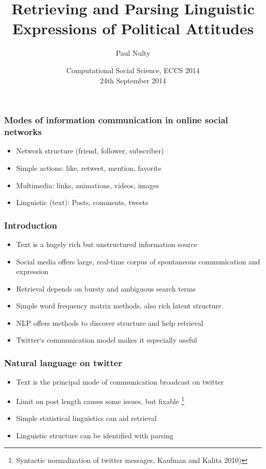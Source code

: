 \documentclass[11pt, table, dvipsnames]{beamer}
\title[Retrieving and Parsing Linguistic Expressions of Political Attitudes]{Retrieving and Parsing Linguistic Expressions of Political Attitudes}
\author{Paul Nulty}
\institute %
{
  Department of Methodology, \\
  London School of Economics and Political Science, \\
  \vspace{2 mm}
  \textit{QUANTESS} ERC Project 
}
\date %
{Computational Social Science, ECCS 2014 \\ 
24th September 2014}
\begin{document}
\begin{frame}%
\titlepage
\end{frame}


\begin{frame}
  \frametitle{Modes of information communication in online social networks}
 \begin{itemize}
  \item Network structure (friend, follower, subscriber)
  \item Simple actions: like, retweet, mention, favorite
  \item Multimedia: links, animations, videos, images
  \item Linguistic (text): Posts, comments, tweets
  \end{itemize}
\end{frame}

\begin{frame}
  \frametitle{Introduction}
  \begin{itemize}
  \item Text is a hugely rich but unstructured information source
  \item Social media offers large, real-time corpus of spontaneous communication and expression
  \item Retrieval depends on bursty and ambiguous search terms
  \item Simple word frequency matrix methods, also rich latent structure
  \item NLP offers methods to discover structure and help retrieval
  \item Twitter`s communication model makes it especially useful
  \end{itemize}
\end{frame}

\begin{frame}
  \frametitle{Natural language on twitter}
  \begin{itemize}
  \item Text is the principal mode of communication broadcast on twitter
  \item Limit on post length causes some issues, but fixable \footnote{Syntactic normalization of twitter messages, Kaufman and Kalita 2010)}
  \item Simple statistical linguistics can aid retrieval
  \item Linguistic structure can be identified with parsing
  \end{itemize}
\end{frame}
\end{document}
